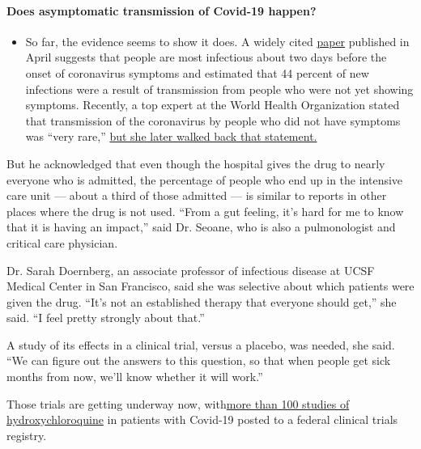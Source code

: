 \begin{itemize}
{  \paragraph{Does asymptomatic transmission of Covid-19
  happen?}\label{does-asymptomatic-transmission-of-covid-19-happen}}

  \begin{itemize}
  \tightlist
  \item
    So far, the evidence seems to show it does. A widely cited
    \href{https://www.nature.com/articles/s41591-020-0869-5}{paper}
    published in April suggests that people are most infectious about
    two days before the onset of coronavirus symptoms and estimated that
    44 percent of new infections were a result of transmission from
    people who were not yet showing symptoms. Recently, a top expert at
    the World Health Organization stated that transmission of the
    coronavirus by people who did not have symptoms was ``very rare,''
    \href{https://www.nytimes.com/2020/06/09/world/coronavirus-updates.html?action=click\&pgtype=Article\&state=default\&region=MAIN_CONTENT_3\&context=storylines_faq\#link-1f302e21}{but
    she later walked back that statement.}
  \end{itemize}
\end{itemize}

But he acknowledged that even though the hospital gives the drug to
nearly everyone who is admitted, the percentage of people who end up in
the intensive care unit --- about a third of those admitted --- is
similar to reports in other places where the drug is not used. ``From a
gut feeling, it's hard for me to know that it is having an impact,''
said Dr. Seoane, who is also a pulmonologist and critical care
physician.

Dr. Sarah Doernberg, an associate professor of infectious disease at
UCSF Medical Center in San Francisco, said she was selective about which
patients were given the drug. ``It's not an established therapy that
everyone should get,'' she said. ``I feel pretty strongly about that.''

A study of its effects in a clinical trial, versus a placebo, was
needed, she said. ``We can figure out the answers to this question, so
that when people get sick months from now, we'll know whether it will
work.''

Those trials are getting underway now,
with\href{https://clinicaltrials.gov/ct2/results?cond=COVID\&term=hydroxychloroquine\&cntry=\&state=\&city=\&dist=}{more
than 100 studies of hydroxychloroquine} in patients with Covid-19 posted
to a federal clinical trials registry.

